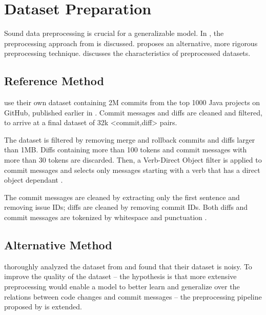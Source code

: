 \section{Dataset Preparation}\label{sec:preprocessing}
Sound data preprocessing is crucial for a generalizable model. In , the preprocessing approach from \citet{jiang_automatically_2017} is discussed.  proposes an alternative, more rigorous preprocessing technique.  discusses the characteristics of preprocessed datasets.

\subsection{Reference Method}\label{sec:prep:existing}

\citet{jiang_automatically_2017} use their own dataset containing 2M commits from the top 1000 Java projects on GitHub, published earlier in \cite{jiang_towards_2017}. Commit messages and diffs are cleaned and filtered, to arrive at a final dataset of 32k <commit,diff> pairs.

The dataset is filtered by removing merge and rollback commits and diffs larger than 1MB. Diffs containing more than 100 tokens and commit messages with more than 30 tokens are discarded. Then, a Verb-Direct Object filter is applied to commit messages and selects only messages starting with a verb that has a direct object dependant \cite{jiang_automatically_2017}. 

The commit messages are cleaned by extracting only the first sentence and removing issue IDs; diffs are cleaned by removing commit IDs. Both diffs and commit messages are tokenized by whitespace and punctuation \cite{jiang_automatically_2017}.



\subsection{Alternative Method}\label{sec:prep:new}
\citet{liu_neural-machine-translation-based_2018} thoroughly analyzed the dataset from \cite{jiang_automatically_2017} and found that their dataset is noisy. To improve the quality of the dataset -- the hypothesis is that more extensive preprocessing would enable a model to better learn and generalize over the relations between code changes and commit messages -- the preprocessing pipeline proposed by \cite{jiang_automatically_2017} is extended.

